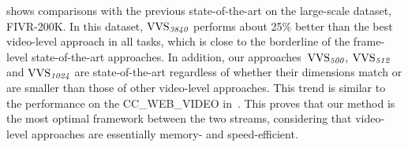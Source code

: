 \documentclass[10pt,twocolumn,letterpaper]{article}
\begin{document}
        
         shows comparisons with the previous state-of-the-art on the large-scale dataset, FIVR-200K. In this dataset, $\textup{VVS}_{\textit{3840}}$ performs about 25\% better than the best video-level approach in all tasks, which is close to the borderline of the frame-level state-of-the-art approaches. In addition, our approaches~$\textup{VVS}_{\textit{500}}$, $\textup{VVS}_{\textit{512}}$ and $\textup{VVS}_{\textit{1024}}$ are state-of-the-art regardless of whether their dimensions match or are smaller than those of other video-level approaches. This trend is similar to the performance on the CC\_WEB\_VIDEO in~. This proves that our method is the most optimal framework between the two streams, considering that video-level approaches are essentially memory- and speed-efficient.
        
\end{document}
